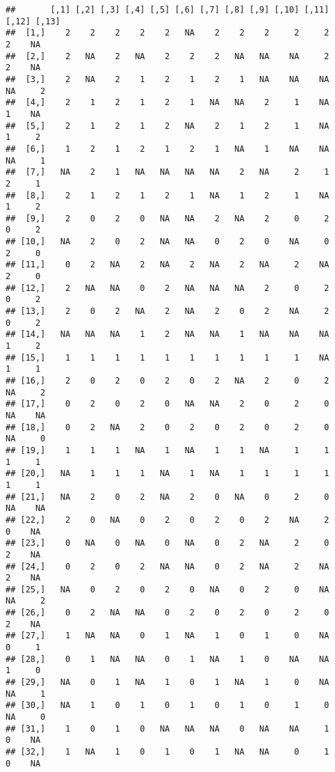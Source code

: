 \documentclass[
]{article}
\begin{document}
\begin{verbatim}
##       [,1] [,2] [,3] [,4] [,5] [,6] [,7] [,8] [,9] [,10] [,11] [,12] [,13]
##  [1,]    2    2    2    2    2   NA    2    2    2     2     2     2    NA
##  [2,]    2   NA    2   NA    2    2    2   NA   NA    NA     2     2    NA
##  [3,]    2   NA    2    1    2    1    2    1   NA    NA    NA    NA     2
##  [4,]    2    1    2    1    2    1   NA   NA    2     1    NA     1    NA
##  [5,]    2    1    2    1    2   NA    2    1    2     1    NA     1     2
##  [6,]    1    2    1    2    1    2    1   NA    1    NA    NA    NA     1
##  [7,]   NA    2    1   NA   NA   NA   NA    2   NA     2     1     2     1
##  [8,]    2    1    2    1    2    1   NA    1    2     1    NA     1     2
##  [9,]    2    0    2    0   NA   NA    2   NA    2     0     2     0     2
## [10,]   NA    2    0    2   NA   NA    0    2    0    NA     0     2     0
## [11,]    0    2   NA    2   NA    2   NA    2   NA     2    NA     2     0
## [12,]    2   NA   NA    0    2   NA   NA   NA    2     0     2     0     2
## [13,]    2    0    2   NA    2   NA    2    0    2    NA     2     0     2
## [14,]   NA   NA   NA    1    2   NA   NA    1   NA    NA    NA     1     2
## [15,]    1    1    1    1    1    1    1    1    1     1    NA     1     1
## [16,]    2    0    2    0    2    0    2   NA    2     0     2    NA     2
## [17,]    0    2    0    2    0   NA   NA    2    0     2     0    NA    NA
## [18,]    0    2   NA    2    0    2    0    2    0     2     0    NA     0
## [19,]    1    1    1   NA    1   NA    1    1   NA     1     1     1     1
## [20,]   NA    1    1    1   NA    1   NA    1    1     1     1     1     1
## [21,]   NA    2    0    2   NA    2    0   NA    0     2     0    NA    NA
## [22,]    2    0   NA    0    2    0    2    0    2    NA     2     0    NA
## [23,]    0   NA    0   NA    0   NA    0    2   NA     2     0     2    NA
## [24,]    0    2    0    2   NA   NA    0    2   NA     2    NA     2    NA
## [25,]   NA    0    2    0    2    0   NA    0    2     0    NA    NA     2
## [26,]    0    2   NA   NA    0    2    0    2    0     2     0     2    NA
## [27,]    1   NA   NA    0    1   NA    1    0    1     0    NA     0     1
## [28,]    0    1   NA   NA    0    1   NA    1    0    NA    NA     1     0
## [29,]   NA    0    1   NA    1    0    1   NA    1     0    NA    NA     1
## [30,]   NA    1    0    1    0    1    0    1    0     1     0    NA     0
## [31,]    1    0    1    0   NA   NA   NA    0   NA    NA     1     0    NA
## [32,]    1   NA    1    0    1    0    1   NA   NA     0     1     0    NA

\end{verbatim}
\end{document}

